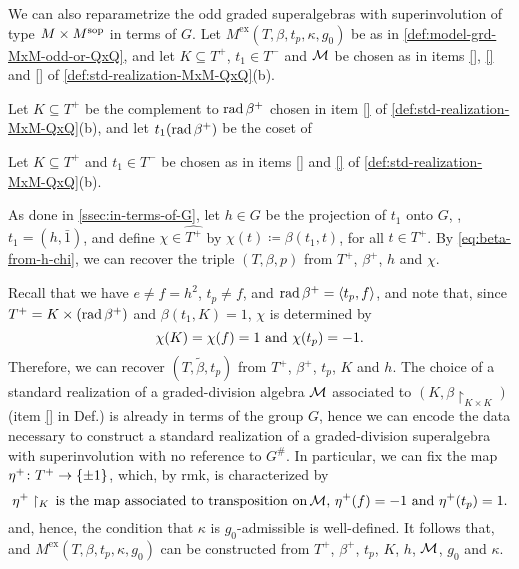 We can also reparametrize the odd graded superalgebras with superinvolution of type $M\times M^{\mathrm{sop}}$ in terms of $G$. 
Let $M^{\mathrm{ex}}(T, \beta, t_p, \kappa, g_0)$ be as in \cref{def:model-grd-MxM-odd-or-QxQ}, and let $K \subseteq T^+$, $t_1 \in T^-$ and $\mathcal M$ be chosen as in items \eqref{}, \eqref{} and \eqref{} of \cref{def:std-realization-MxM-QxQ}(b). 


Let $K \subseteq T^+$ be the complement to $\operatorname{rad} \beta^+$ chosen in item \eqref{} of \cref{def:std-realization-MxM-QxQ}(b), and let $t_1 (\operatorname{rad} \beta^+)$ be the coset of 

Let $K \subseteq T^+$ and $t_1 \in T^-$ be chosen as in items \eqref{} and \eqref{} of \cref{def:std-realization-MxM-QxQ}(b). 


As done in \cref{ssec:in-terms-of-G}, let $h \in G$ be the projection of $t_1$ onto $G$, \ie, $t_1 = (h, \bar 1)$, and define $\chi \in \widehat{T^+}$ by $\chi(t) \coloneqq \beta(t_1, t)$, for all $t\in T^+$. 
By \cref{eq:beta-from-h-chi}, we can recover the triple $(T, \beta, p)$ from $T^+$, $\beta^+$, $h$ and $\chi$. 

Recall that we have $e \neq f = h^2$, $t_p \neq f$, and $\operatorname{rad} \beta^+ = \langle t_p, f \rangle$, and note that, since $T^+ = K \times (\operatorname{rad} \beta^+)$ and $\beta(t_1, K) = 1$, $\chi$ is determined by 
\[\label{eq:equivalent-def-of-chi}
    \chi(K) = \chi(f) = 1 \,\,\text{and}\,\, \chi(t_p) = -1.
\]
Therefore, we can recover $(T, \tilde\beta, t_p)$ from $T^+$, $\beta^+$, $t_p$, $K$ and $h$.  
The choice of a standard realization of a graded-division algebra $\mathcal M$ associated to $(K, \beta\restriction_{K \times K})$ (item \eqref{} in Def.) is already in terms of the group $G$, hence we can encode the data necessary to construct a standard realization of a graded-division superalgebra with superinvolution with no reference to $G^\#$. 
In particular, we can fix the map $\eta^+\colon T^+ \to \{ \pm 1 \}$, 
which, by rmk, is characterized by
\[\label{eq:eta+-unsharpening-MxM}
    \eta^+\restriction_{K} \,\text{is the map associated to transposition on}\, \mathcal M,\, \eta^+(f) = -1 \,\,\text{and}\,\, \eta^+(t_p) =1. 
\]
and, hence, the condition that $\kappa$ is $g_0$-admissible is well-defined. 
It follows that, and $M^{\mathrm{ex}}(T, \beta, t_p, \kappa, g_0)$ can be constructed from $T^+$, $\beta^+$, $t_p$, $K$, $h$, $\mathcal M$, $g_0$ and $\kappa$. 


